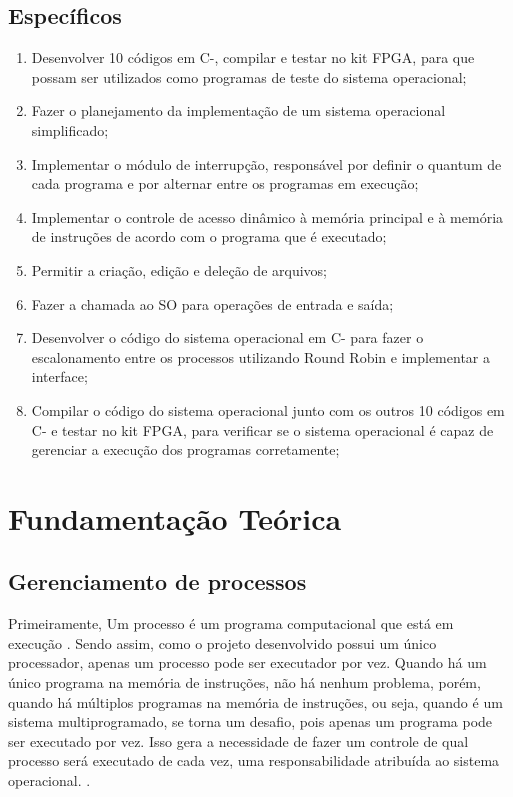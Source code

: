 \documentclass[
	12pt,				%
	oneside,
	a4paper,			%
	english,			%
	french,				%
	spanish,			%
	brazil,				%
	]{abntex2}
\begin{document}
\section{Específicos}
\begin{enumerate}
   	\item Desenvolver 10 códigos em C-, compilar e testar no kit FPGA, para que possam ser utilizados como programas de teste do sistema operacional;
	\item Fazer o planejamento da implementação de um sistema operacional simplificado;
	\item Implementar o módulo de interrupção, responsável por definir o quantum de cada programa e por alternar entre os programas em execução;
	\item Implementar o controle de acesso dinâmico à memória principal e à memória de instruções de acordo com o programa que é executado;
	\item Permitir a criação, edição e deleção de arquivos;
	\item Fazer a chamada ao SO para operações de entrada e saída;
	\item Desenvolver o código do sistema operacional em C- para fazer o escalonamento entre os processos utilizando Round Robin e implementar a interface;
	\item Compilar o código do sistema operacional junto com os outros 10 códigos em C- e testar no kit FPGA, para verificar se o sistema operacional é capaz de gerenciar a execução dos programas corretamente;
   
 \end{enumerate}


\chapter{Fundamentação Teórica}

\section{Gerenciamento de processos}

Primeiramente, Um processo é um programa computacional que está em execução \cite{tanenbaum2016sistemas}. Sendo assim, como o projeto desenvolvido possui um único processador, apenas um processo pode ser executador por vez. Quando há um único programa na memória de instruções, não há nenhum problema, porém, quando há múltiplos programas na memória de instruções, ou seja, quando é um sistema multiprogramado, se torna um desafio, pois apenas um programa pode ser executado por vez. Isso gera a necessidade de fazer um controle de qual processo será executado de cada vez, uma responsabilidade atribuída ao sistema operacional. \cite{tanenbaum2016sistemas}.
\end{document}
